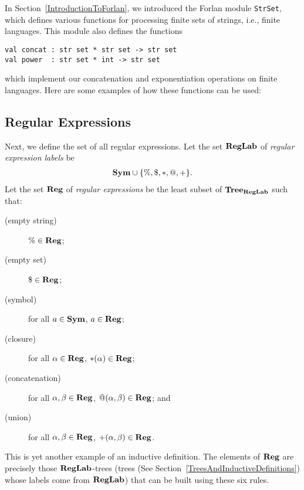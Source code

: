 In Section~\ref{IntroductionToForlan}, we introduced the
Forlan module \texttt{StrSet},
which defines various functions for processing finite sets of strings,
i.e., finite languages.  This module also defines the
functions
%
%
\begin{verbatim}
val concat : str set * str set -> str set
val power  : str set * int -> str set
\end{verbatim}
which implement our concatenation and exponentiation operations
on finite languages.  Here are some examples of how these functions
can be used:


\subsection{Regular Expressions}

%
%
%
Next, we define the set of all regular expressions.  Let the set
$\mathbf{RegLab}$ of \emph{regular expression labels} be
\begin{gather*}
\mathbf{Sym}\cup\{\%,\$,{*},@,{+}\} .
\end{gather*}
%
Let the set $\mathbf{Reg}$ of
\emph{regular expressions} be the least subset of
$\mathbf{Tree}_{\mathbf{RegLab}}$ such that:
%
%
%
\begin{description}
\item[\quad(empty string)] $\%\in\mathbf{Reg}$;

\item[\quad(empty set)] $\$\in\mathbf{Reg}$;

\item[\quad(symbol)] for all $a\in\mathbf{Sym}$, $a\in\mathbf{Reg}$;

\item[\quad(closure)] for all $\alpha\in\mathbf{Reg}$, ${*}(\alpha)\in\mathbf{Reg}$;
%
%

\item[\quad(concatenation)] for all $\alpha,\beta\in\mathbf{Reg}$,
$@(\alpha,\beta)\in\mathbf{Reg}$; and
%
%

\item[\quad(union)] for all $\alpha,\beta\in\mathbf{Reg}$, ${+}(\alpha,\beta)\in\mathbf{Reg}$.
%
%
\end{description}
This is yet another example of an inductive definition.  The elements
of $\mathbf{Reg}$ are precisely those $\mathbf{RegLab}$-trees
(trees (See Section~\ref{TreesAndInductiveDefinitions})
whose labels come from $\mathbf{RegLab}$) that can be built using these six
rules.

